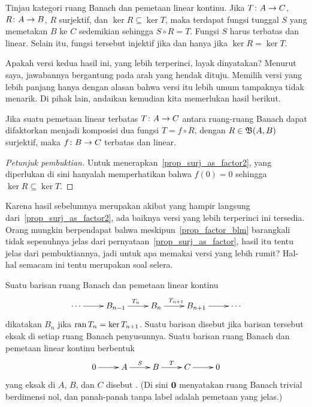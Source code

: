 \begin{prop}\label{prop_surj_as_factor2} Tinjau kategori ruang Banach
dan pemetaan linear kontinu. Jika $T\colon A \rightarrow C$, $R\colon A \rightarrow B$, $R$
surjektif, dan $\ker R \subseteq \ker T$, maka terdapat fungsi tunggal
$S$ yang memetakan $B$ ke $C$ sedemikian sehingga $S\circ R = T$. Fungsi $S$ harus
terbatas dan linear. Selain itu, fungsi tersebut injektif jika dan hanya jika $\ker R = \ker T$.
\end{prop}

Apakah versi kedua hasil ini, yang lebih terperinci, layak dinyatakan? Menurut saya, jawabannya bergantung pada
arah yang hendak dituju. Memilih versi yang lebih panjang hanya dengan alasan bahwa versi itu lebih umum
tampaknya tidak menarik. Di pihak lain, andaikan kemudian kita memerlukan hasil berikut.

\begin{prop}\label{prop_factor_blm} Jika suatu pemetaan linear terbatas $T\colon A \rightarrow C$ antara ruang-ruang Banach dapat difaktorkan
menjadi komposisi dua fungsi $T = f \circ R$, dengan $R \in \mathfrak{B}(A,B)$ surjektif,
maka $f \colon B \rightarrow C$ terbatas dan linear.
\end{prop}

\begin{proof}[\emph{Petunjuk pembuktian}] Untuk menerapkan~\ref{prop_surj_as_factor2}, yang diperlukan di sini hanyalah
memperhatikan bahwa $f(0) = 0$ sehingga $\ker R \subseteq \ker T$.   \ns
\end{proof}

Karena hasil sebelumnya merupakan akibat yang hampir langsung dari~\ref{prop_surj_as_factor2}, ada baiknya
versi yang lebih terperinci ini tersedia. Orang mungkin berpendapat bahwa meskipun~\ref{prop_factor_blm} barangkali tidak
sepenuhnya jelas dari pernyataan~\ref{prop_surj_as_factor}, hasil itu tentu jelas dari
pembuktiannya, jadi untuk apa memakai versi yang lebih rumit? Hal-hal semacam ini tentu merupakan soal selera.

\begin{defn}\label{defn_Bsp_exact_seq} Suatu barisan ruang Banach dan pemetaan linear kontinu
   \[\xymatrix{{\cdots}\ar[r] & B_{n-1}\ar[r]^{T_n}
          & B_n\ar[r]^{T_{n+1}} & B_{n+1}\ar[r] & {\cdots}
   }\]
dikatakan
 $B_n$ jika $\operatorname{ran} T_n = \ker T_{n+1}$. Suatu barisan disebut  jika barisan tersebut
eksak di setiap ruang Banach penyusunnya. Suatu barisan ruang Banach dan
pemetaan linear kontinu berbentuk
   \begin{equation}\label{001500202i}\xymatrix{
      0 \ar[r] & A \ar[r]^S & B\ar[r]^T & C\ar[r] & 0
   }\end{equation}
yang eksak di $A$, $B$, dan $C$ disebut . (Di sini $\mathbf{0}$ menyatakan ruang Banach trivial
berdimensi nol, dan panah-panah tanpa label adalah pemetaan yang jelas.)
\end{defn}

